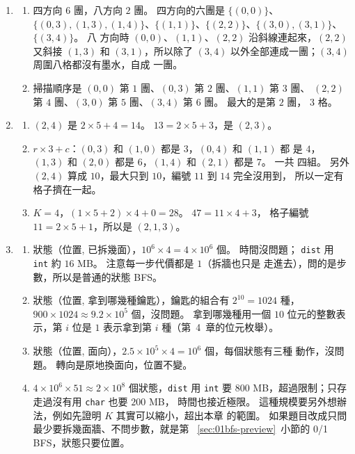 \begin{enumerate}
\item
\begin{enumerate}
\item 四方向 $6$ 團，八方向 $2$ 團。 四方向的六團是 $\{(0,0)\}$、$\{(0,3),
(1,3), (1,4)\}$、$\{(1,1)\}$、$\{(2,2)\}$、$\{(3,0), (3,1)\}$、$\{(3,4)\}$。 八
方向時 $(0,0)$、$(1,1)$、$(2,2)$ 沿斜線連起來，$(2,2)$ 又斜接 $(1,3)$ 和
$(3,1)$，所以除了 $(3,4)$ 以外全部連成一團；$(3,4)$ 周圍八格都沒有墨水，自成
一團。
\item 掃描順序是 $(0,0)$ 第 $1$ 團、$(0,3)$ 第 $2$ 團、$(1,1)$ 第 $3$ 團、
$(2,2)$ 第 $4$ 團、$(3,0)$ 第 $5$ 團、$(3,4)$ 第 $6$ 團。 最大的是第 $2$ 團，
$3$ 格。
\end{enumerate}

\item
\begin{enumerate}
\item $(2, 4)$ 是 $2 \times 5 + 4 = 14$。 $13 = 2 \times 5 + 3$，是 $(2, 3)$。
\item $r \times 3 + c$：$(0, 3)$ 和 $(1, 0)$ 都是 $3$，$(0, 4)$ 和 $(1, 1)$ 都
是 $4$，$(1, 3)$ 和 $(2, 0)$ 都是 $6$，$(1, 4)$ 和 $(2, 1)$ 都是 $7$。 一共
四組。 另外 $(2, 4)$ 算成 $10$，最大只到 $10$，編號 $11$ 到 $14$ 完全沒用到，
所以一定有格子擠在一起。
\item $K = 4$，$(1 \times 5 + 2) \times 4 + 0 = 28$。 $47 = 11 \times 4 + 3$，
格子編號 $11 = 2 \times 5 + 1$，所以是 $(2, 1, 3)$。
\end{enumerate}

\item
\begin{enumerate}
\item 狀態（位置, 已拆幾面），$10^6 \times 4 = 4 \times 10^6$ 個。 時間沒問題；
\texttt{dist} 用 \texttt{int} 約 $16$ MB。 注意每一步代價都是 $1$（拆牆也只是
走進去），問的是步數，所以是普通的狀態 BFS。
\item 狀態（位置, 拿到哪幾種鑰匙），鑰匙的組合有 $2^{10} = 1024$ 種，
$900 \times 1024 \approx 9.2 \times 10^5$ 個，沒問題。 拿到哪幾種用一個
$10$ 位元的整數表示，第 $i$ 位是 $1$ 表示拿到第 $i$ 種（第~4~章的位元枚舉）。
\item 狀態（位置, 面向），$2.5 \times 10^5 \times 4 = 10^6$ 個，每個狀態有三種
動作，沒問題。 轉向是原地換面向，位置不變。
\item $4 \times 10^6 \times 51 \approx 2 \times 10^8$ 個狀態，\texttt{dist} 用
\texttt{int} 要 $800$ MB，超過限制；只存走過沒有用 \texttt{char} 也要 $200$ MB，
時間也接近極限。 這種規模要另外想辦法，例如先證明 $K$ 其實可以縮小，超出本章
的範圍。 如果題目改成只問最少要拆幾面牆、不問步數，就是第
~\ref{sec:01bfs-preview}~小節的 0/1 BFS，狀態只要位置。
\end{enumerate}


\end{enumerate}
